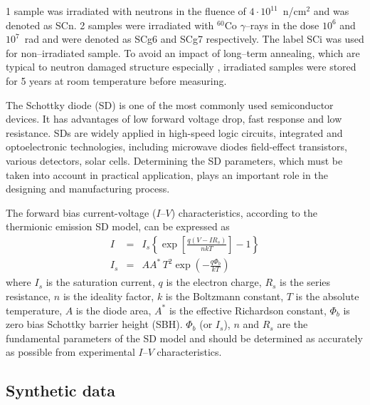 \documentclass[aip,jap,reprint]{revtex4-1}
\begin{document}
1 sample  was  irradiated  with  neutrons  in  the fluence  of $4\cdot10^{11}$~n/cm$^2$  and was denoted as SCn.
2 samples were irradiated  with  $^{60}$Co $\gamma$--rays in the  dose  $10^6$ and $10^7$~rad and were denoted as SCg6 and SCg7 respectively.
The label SCi was used for non--irradiated sample.
To avoid an impact of  long--term annealing, which are typical to neutron damaged structure especially \cite{NIEL:Moll,Rew:Srour}, irradiated samples were stored  for  5 years  at  room  temperature before measuring.





The Schottky diode (SD) is one of the most commonly used semiconductor devices.
It has advantages of low forward voltage drop, fast response and low resistance.
SDs are widely applied in high-speed logic circuits, integrated and optoelectronic technologies, including microwave diodes field-effect transistors, various detectors, solar cells.
Determining the SD parameters, which must be taken into account in practical application, plays an important role in the designing and manufacturing process.

The forward bias current-voltage ($I$--$V$) characteristics, according to the thermionic emission SD model, can be expressed as\cite{Rhoderick1988}
\begin{eqnarray}
\label{eqSD}
I&=&I_s\left\{\exp\left[\frac{q(V-IR_s)}{nkT}\right]-1\right\}\\
\label{eqIs}
I_s&=&AA^*\,T^2\exp\left(-\frac{q\Phi_b}{kT}\right)
\end{eqnarray}
where
$I_s$ is the saturation current,
$q$ is the electron charge,
$R_s$ is the series resistance,
$n$ is the ideality factor,
$k$ is the Boltzmann constant,
$T$ is the absolute temperature,
$A$ is the diode area,
$A^*$ is the effective Richardson constant,
$\Phi_b$ is zero bias Schottky barrier height (SBH).
$\Phi_b$ (or $I_s$), $n$ and $R_s$ are the fundamental parameters of the SD model and should be determined as accurately as possible from experimental $I$--$V$ characteristics.



\subsection{Synthetic data\label{SubData}}
\end{document}
